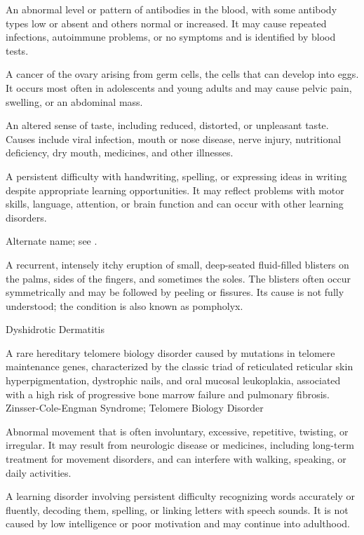  An abnormal level or pattern of antibodies in the blood, with some antibody types low or absent and others normal or increased. It may cause repeated infections, autoimmune problems, or no symptoms and is identified by blood tests.

 A cancer of the ovary arising from germ cells, the cells that can develop into eggs. It occurs most often in adolescents and young adults and may cause pelvic pain, swelling, or an abdominal mass.

 An altered sense of taste, including reduced, distorted, or unpleasant taste. Causes include viral infection, mouth or nose disease, nerve injury, nutritional deficiency, dry mouth, medicines, and other illnesses.

 A persistent difficulty with handwriting, spelling, or expressing ideas in writing despite appropriate learning opportunities. It may reflect problems with motor skills, language, attention, or brain function and can occur with other learning disorders.

 Alternate name; see .

 A recurrent, intensely itchy eruption of small, deep-seated fluid-filled blisters
on the palms, sides of the fingers, and sometimes the soles. The blisters often occur
symmetrically and may be followed by peeling or fissures. Its cause is not fully understood;
the condition is also known as pompholyx.

\synonyms
Dyshidrotic Dermatitis

 A rare hereditary telomere biology disorder caused by mutations in telomere maintenance genes, characterized by the classic triad of reticulated reticular skin hyperpigmentation, dystrophic nails, and oral mucosal leukoplakia, associated with a high risk of progressive bone marrow failure and pulmonary fibrosis.
\synonyms
Zinsser-Cole-Engman Syndrome; Telomere Biology Disorder

 Abnormal movement that is often involuntary, excessive, repetitive, twisting, or irregular. It may result from neurologic disease or medicines, including long-term treatment for movement disorders, and can interfere with walking, speaking, or daily activities.

 A learning disorder involving persistent difficulty recognizing words accurately or fluently, decoding them, spelling, or linking letters with speech sounds. It is not caused by low intelligence or poor motivation and may continue into adulthood.

